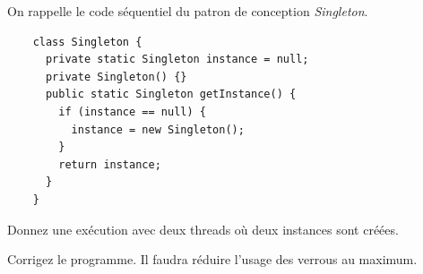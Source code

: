 
\begingroup

\begin{exercice}[Singleton]
  \label{exo:memory/singleton}
  
  On rappelle le code séquentiel du patron de conception \emph{Singleton}.

  \begin{lstlisting}
    class Singleton {
      private static Singleton instance = null;
      private Singleton() {}
      public static Singleton getInstance() {
        if (instance == null) {
          instance = new Singleton();
        }
        return instance;
      }
    }
  \end{lstlisting}
  
  \begin{questions}
  \item Donnez une exécution avec deux threads où deux instances sont créées.
  \item Corrigez le programme. Il faudra réduire l'usage des verrous au maximum.
  \end{questions}

\end{exercice}

\endgroup
\endinput
